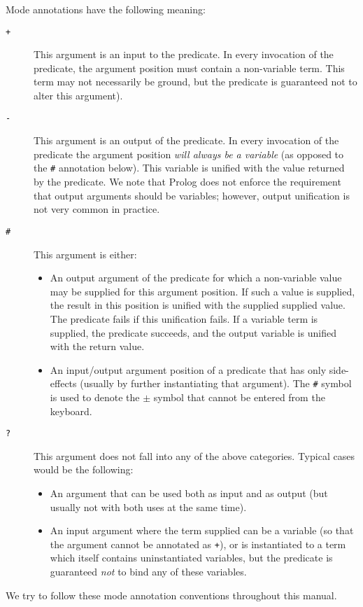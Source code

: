 Mode annotations have the following meaning:
\begin{description}
\item[{\tt +}]
	This argument is an input to the predicate.  In every invocation
	of the predicate, the argument position must contain a non-variable
	term.  This term may not necessarily be ground, but the 
	predicate is guaranteed not to alter this argument).

\item[{\tt -}]
	This argument is an output of the predicate.  In every
	invocation of the predicate the argument
	position {\em will always be a variable\/} (as opposed to 
	the {\tt \#} annotation below).
	This variable is unified with the value returned by the predicate.
	We note that Prolog does not enforce the requirement that output
	arguments should be variables; however, output unification is not
	very common in practice.

\item[{\tt \#}]
	This argument is either:
	\begin{itemize}
	\item	An output argument of the predicate for which a non-variable
		value may be supplied for this argument position.  If such a
		value is supplied, the result in this position is unified with
		the supplied supplied value.  The predicate fails if this
		unification fails.  If a variable term is supplied, the
		predicate succeeds, and the output variable is unified with
		the return value.

	\item	An input/output argument position of a predicate that has
		only side-effects (usually by further instantiating that
		argument).  The {\tt \#} symbol is used to denote the $\pm$
		symbol that cannot be entered from the keyboard.
	\end{itemize}
\item[{\tt ?}]
	This argument does not fall into any of the above categories. 
        Typical cases would be the following:
	\begin{itemize}
	\item	An argument that can be used both as input and as output
		(but usually not with both uses at the same time).

	\item	An input argument where the term supplied can be a variable
		(so that the argument cannot be annotated as {\tt +}), or is
		instantiated to a term which itself contains uninstantiated
		variables, but the predicate is guaranteed {\em not\/} to
		bind any of these variables.

	\end{itemize}
\end{description}
We try to follow these mode annotation conventions throughout this manual.

